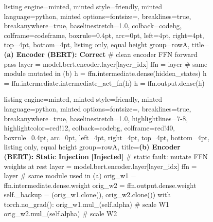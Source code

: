 \begin{figure}[!htbp]
\centering
\begin{minipage}[t]{0.48\textwidth}
\begin{tcblisting}{
  listing engine=minted, minted style=friendly,
  minted language=python,
  minted options={fontsize=\scriptsize, breaklines=true, breakanywhere=true, baselinestretch=1.0},
  colback=codebg, colframe=codeframe, boxrule=0.4pt, arc=0pt,
  left=4pt, right=4pt, top=4pt, bottom=4pt,
  listing only, equal height group=rowA,
  title={\scriptsize\bfseries (a) Encoder (BERT): Correct}}
# clean encoder FFN forward pass
layer = model.bert.encoder.layer[layer_idx]
ffn = layer  # same module mutated in (b)
h = ffn.intermediate.dense(hidden_states)
h = ffn.intermediate.intermediate_act_fn(h)
h = ffn.output.dense(h)
\end{tcblisting}
\end{minipage}\hfill
\begin{minipage}[t]{0.48\textwidth}
\begin{tcblisting}{
  listing engine=minted, minted style=friendly,
  minted language=python,
  minted options={fontsize=\scriptsize, breaklines=true, breakanywhere=true, baselinestretch=1.0,
    highlightlines={7-8}, highlightcolor=red!12},
  colback=codebg, colframe=red!40, boxrule=0.4pt, arc=0pt,
  left=4pt, right=4pt, top=4pt, bottom=4pt,
  listing only, equal height group=rowA,
  title={\scriptsize\bfseries (b) Encoder (BERT): Static Injection [Injected]}}
# static fault: mutate FFN weights at rest
layer = model.bert.encoder.layer[layer_idx]
ffn = layer  # same module used in (a)
orig_w1 = ffn.intermediate.dense.weight
orig_w2 = ffn.output.dense.weight
self._backup = (orig_w1.clone(), orig_w2.clone())
with torch.no_grad():
    orig_w1.mul_(self.alpha)  # scale W1
    orig_w2.mul_(self.alpha)  # scale W2
\end{tcblisting}
\end{minipage}



\end{figure}
